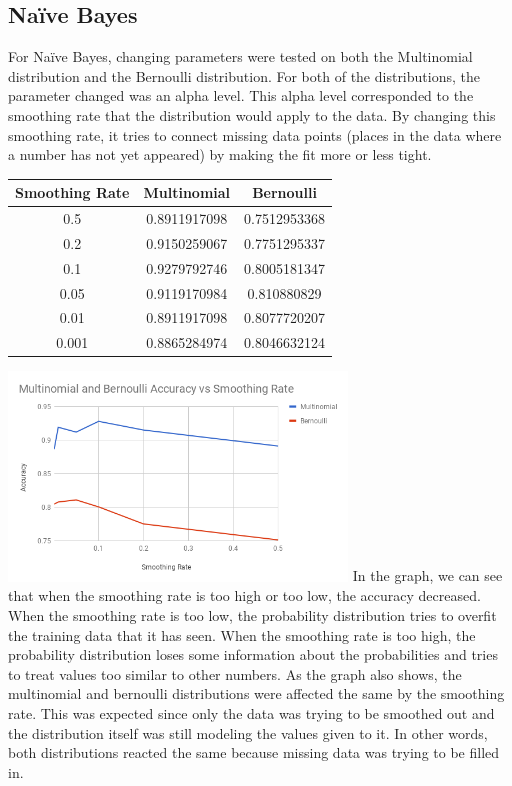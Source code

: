 \documentclass{article}
\begin{document}
        \subsection{Na\"ive Bayes}
        For Na\"ive Bayes, changing parameters were tested on both the Multinomial distribution 
        and the Bernoulli distribution. For both of the distributions, the parameter changed was 
        an alpha level. This alpha level corresponded to the smoothing rate that the distribution 
        would apply to the data. By changing this smoothing rate, it tries to connect missing data 
        points (places in the data where a number has not yet appeared) by making the fit more or 
        less tight.
        \begin{center}
            \begin{tabular}{|c|c|c|}
                \hline
                Smoothing Rate & Multinomial & Bernoulli \\
                \hline
                0.5 & 0.8911917098 & 0.7512953368 \\
                0.2 & 0.9150259067 & 0.7751295337 \\
                0.1 & 0.9279792746 & 0.8005181347 \\
                0.05 & 0.9119170984 & 0.810880829 \\
                0.01 & 0.8911917098 & 0.8077720207 \\
                0.001 & 0.8865284974 & 0.8046632124 \\
                \hline
            \end{tabular}
        \end{center}
        \includegraphics[width=9cm]{graphs/Naive_Bayes_comparison}
        In the graph, we can see that when the smoothing rate is too high or too low, the accuracy decreased. When the smoothing rate is too low, the probability distribution tries to overfit the training data that it has seen. When the smoothing rate is too high, the probability distribution loses some information about the probabilities and tries to treat values too similar to other numbers. As the graph also shows, the multinomial and bernoulli distributions were affected the same by the smoothing rate. This was expected since only the data was trying to be smoothed out and the distribution itself was still modeling the values given to it. In other words, both distributions reacted the same because missing data was trying to be filled in.
\end{document}
